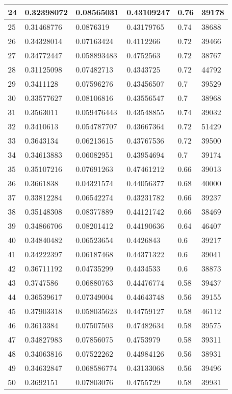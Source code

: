 \begin{longtable}{|l|l|l|l|l|l|}
24 & 0.32398072 & 0.08565031 & 0.43109247 & 0.76 & 39178 \\ \hline 
25 & 0.31468776 & 0.0876319 & 0.43179765 & 0.74 & 38688 \\ \hline 
26 & 0.34328014 & 0.07163424 & 0.4112266 & 0.72 & 39466 \\ \hline 
27 & 0.34772447 & 0.058893483 & 0.4752563 & 0.72 & 38767 \\ \hline 
28 & 0.31125098 & 0.07482713 & 0.4343725 & 0.72 & 44792 \\ \hline 
29 & 0.3411128 & 0.07596276 & 0.43456507 & 0.7 & 39529 \\ \hline 
30 & 0.33577627 & 0.08106816 & 0.43556547 & 0.7 & 38968 \\ \hline 
31 & 0.3563011 & 0.059476443 & 0.43548855 & 0.74 & 39032 \\ \hline 
32 & 0.3410613 & 0.054787707 & 0.43667364 & 0.72 & 51429 \\ \hline 
33 & 0.3643134 & 0.06213615 & 0.43767536 & 0.72 & 39500 \\ \hline 
34 & 0.34613883 & 0.06082951 & 0.43954694 & 0.7 & 39174 \\ \hline 
35 & 0.35107216 & 0.07691263 & 0.47461212 & 0.66 & 39013 \\ \hline 
36 & 0.3661838 & 0.04321574 & 0.44056377 & 0.68 & 40000 \\ \hline 
37 & 0.33812284 & 0.06542274 & 0.43231782 & 0.66 & 39237 \\ \hline 
38 & 0.35148308 & 0.08377889 & 0.44121742 & 0.66 & 38469 \\ \hline 
39 & 0.34866706 & 0.08201412 & 0.44190636 & 0.64 & 46407 \\ \hline 
40 & 0.34840482 & 0.06523654 & 0.4426843 & 0.6 & 39217 \\ \hline 
41 & 0.34222397 & 0.06187468 & 0.44371322 & 0.6 & 39041 \\ \hline 
42 & 0.36711192 & 0.04735299 & 0.4434533 & 0.6 & 38873 \\ \hline 
43 & 0.3747586 & 0.06880763 & 0.44476774 & 0.58 & 39437 \\ \hline 
44 & 0.36539617 & 0.07349004 & 0.44643748 & 0.56 & 39155 \\ \hline 
45 & 0.37903318 & 0.058035623 & 0.44759127 & 0.58 & 46112 \\ \hline 
46 & 0.3613384 & 0.07507503 & 0.47482634 & 0.58 & 39575 \\ \hline 
47 & 0.34827983 & 0.07856075 & 0.4753979 & 0.58 & 39311 \\ \hline 
48 & 0.34063816 & 0.07522262 & 0.44984126 & 0.56 & 38931 \\ \hline 
49 & 0.34632847 & 0.068586774 & 0.43133068 & 0.56 & 39496 \\ \hline 
50 & 0.3692151 & 0.07803076 & 0.4755729 & 0.58 & 39931 \\ \hline 
\end{longtable}